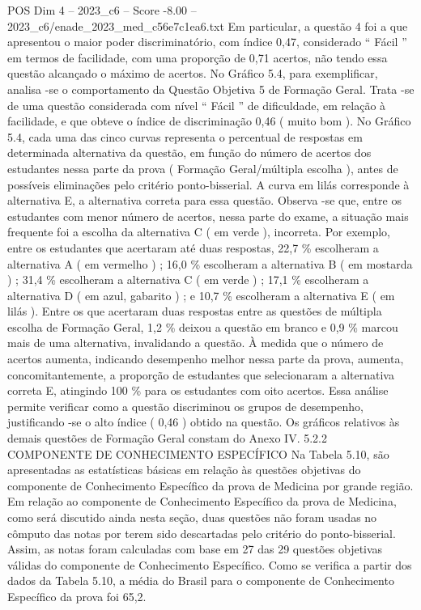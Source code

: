 \begin{textsample}{POS Dim 4 – 2023\_c6 – Score -8.00 – 2023\_c6/enade\_2023\_med\_c56e7c1ea6.txt}
Em particular, a questão 4 foi a que apresentou o maior poder discriminatório, com índice 0,47, considerado “ Fácil ” em termos de facilidade, com uma proporção de 0,71 acertos, não tendo essa questão alcançado o máximo de acertos.
No Gráfico 5.4, para exemplificar, analisa -se o comportamento da Questão Objetiva 5 de Formação Geral.
Trata -se de uma questão considerada com nível “ Fácil ” de dificuldade, em relação à facilidade, e que obteve o índice de discriminação 0,46 ( muito bom ).
No Gráfico 5.4, cada uma das cinco curvas representa o percentual de respostas em determinada alternativa da questão, em função do número de acertos dos estudantes nessa parte da prova ( Formação Geral/múltipla escolha ), antes de possíveis eliminações pelo critério ponto-bisserial.
A curva em lilás corresponde à alternativa E, a alternativa correta para essa questão.
Observa -se que, entre os estudantes com menor número de acertos, nessa parte do exame, a situação mais frequente foi a escolha da alternativa C ( em verde ), incorreta.
Por exemplo, entre os estudantes que acertaram até duas respostas, 22,7 \% escolheram a alternativa A ( em vermelho ) ; 16,0 \% escolheram a alternativa B ( em mostarda ) ; 31,4 \% escolheram a alternativa C ( em verde ) ; 17,1 \% escolheram a alternativa D ( em azul, gabarito ) ; e 10,7 \% escolheram a alternativa E ( em lilás ).
Entre os que acertaram duas respostas entre as questões de múltipla escolha de Formação Geral, 1,2 \% deixou a questão em branco e 0,9 \% marcou mais de uma alternativa, invalidando a questão.
À medida que o número de acertos aumenta, indicando desempenho melhor nessa parte da prova, aumenta, concomitantemente, a proporção de estudantes que selecionaram a alternativa correta E, atingindo 100 \% para os estudantes com oito acertos.
Essa análise permite verificar como a questão discriminou os grupos de desempenho, justificando -se o alto índice ( 0,46 ) obtido na questão.
Os gráficos relativos às demais questões de Formação Geral constam do Anexo IV. 5.2.2 COMPONENTE DE CONHECIMENTO ESPECÍFICO Na Tabela 5.10, são apresentadas as estatísticas básicas em relação às questões objetivas do componente de Conhecimento Específico da prova de Medicina por grande região.
Em relação ao componente de Conhecimento Específico da prova de Medicina, como será discutido ainda nesta seção, duas questões não foram usadas no cômputo das notas por terem sido descartadas pelo critério do ponto-bisserial.
Assim, as notas foram calculadas com base em 27 das 29 questões objetivas válidas do componente de Conhecimento Específico.
Como se verifica a partir dos dados da Tabela 5.10, a média do Brasil para o componente de Conhecimento Específico da prova foi 65,2.

\end{textsample}
